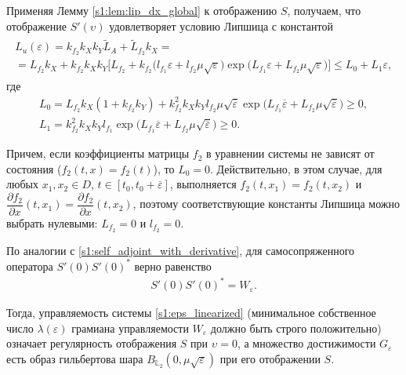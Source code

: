 \documentclass[../main.tex]{subfiles}
\begin{document}
 Применяя Лемму \ref{s1:lem:lip_dx_global} к отображению $S$, получаем, что отображение $S'(\upsilon)$ удовлетворяет условию Липшица с константой 
 \begin{gather}\label{s1:lip_eps}
 \begin{gathered}
 	 L_u(\varepsilon) = k_{f_2} k_X k_Y \widetilde{L}_A + \widetilde{L}_{f_2} k_X  = \\ = 
 	L_{f_2} k_X + 
 	k_{f_2} k_X k_Y \Big[ L_{f_2} + k_{f_2} \Big( l_{f_1}  \varepsilon  + l_{f_2}  \mu \sqrt{\varepsilon} \Big) \exp\big( L_{f_1} \varepsilon + L_{f_2} \mu \sqrt{\varepsilon} \big) \Big] \leqslant 
 	L_0 + L_1  \varepsilon,
 \end{gathered}
 \end{gather} 
 где 
 \begin{gather*}
 	L_0 = L_{f_2} k_X (1 + k_{f_2}  k_Y) + 
 	k_{f_2}^2 k_X k_Y l_{f_2}  \mu \sqrt{\overline{\varepsilon}} \exp\big( L_{f_1} \overline{\varepsilon} + L_{f_2} \mu  \sqrt{\overline{\varepsilon}} \big) \geqslant 0, \\
 	 L_1 = k_{f_2}^2 k_X k_Y l_{f_1} \exp\big( L_{f_1} \overline{\varepsilon} + L_{f_2} \mu \sqrt{\overline{\varepsilon}} \big) \geqslant 0.
 \end{gather*}  
 
 Причем, если коэффициенты матрицы $f_2$ в уравнении системы не зависят от состояния ($f_2(t,x) = f_2(t)$), то $L_0 = 0$. 
Действительно, в этом случае, для любых $x_1, x_2 \in D$, $t\in [t_0, t_0 + \overline{\varepsilon}]$, выполняется $f_2(t,x_1) = f_2(t, x_2)$ и $\dfrac{\partial f_2}{\partial x} (t, x_1) = \dfrac{\partial f_2}{\partial x} (t, x_2)$, поэтому соответствующие константы Липшица можно выбрать нулевыми:   $ L_{f_2} = 0$ и $l_{f_2} = 0$.
  
По аналогии с \eqref{s1:self_adjoint_with_derivative}, для самосопряженного оператора $S'(0)S'(0)^*$ верно равенство 
\begin{gather*}
	S'(0)S'(0)^* = W_{\varepsilon}. 
\end{gather*}
  
Тогда, управляемость системы \eqref{s1:eps_linearized} (минимальное собственное число $ \lambda(\varepsilon) $ грамиана управляемости $W_{\varepsilon}$ должно быть строго положительно) означает регулярность отображения $S$ при $\upsilon = 0$, а множество достижимости $G_{\varepsilon}$ есть образ гильбертова шара $B_{\mathbb{L}_2}(0,\mu\sqrt{\varepsilon})$ при его отображении $S$.
 
\end{document}

